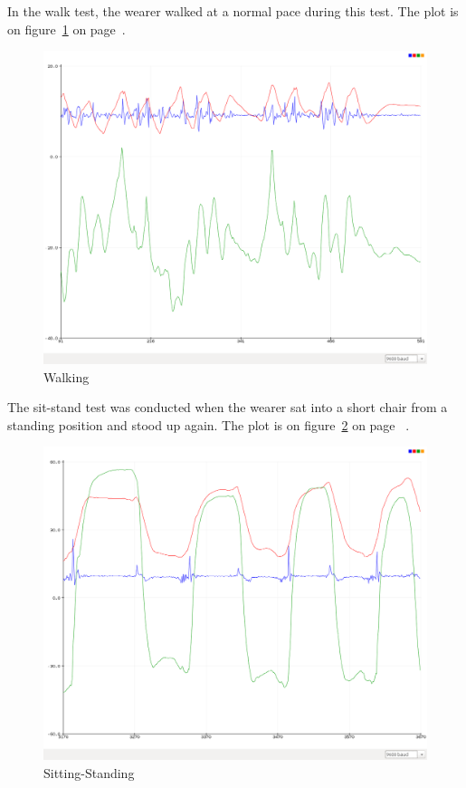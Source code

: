 \documentclass[11pt, a4paper]{article}
\begin{document}
\noindent In the walk test, the wearer walked at a normal pace during this
test. The plot is on figure~\ref{fig:walk} on page~\pageref{fig:walk}.
\begin{figure}
    \centering
    \includegraphics[width=0.7\linewidth]{walk.png}
    \caption{Walking}
    \label{fig:walk}
\end{figure}

\noindent The sit-stand test was conducted when the wearer sat into a short chair from a
standing position and stood up again. The plot is on figure~\ref{fig:ss} on page
~\pageref{fig:ss}.
\begin{figure}
    \centering
    \includegraphics[width=0.7\linewidth]{sit-stand.png}
    \caption{Sitting-Standing}
    \label{fig:ss}
\end{figure}
\end{document}
